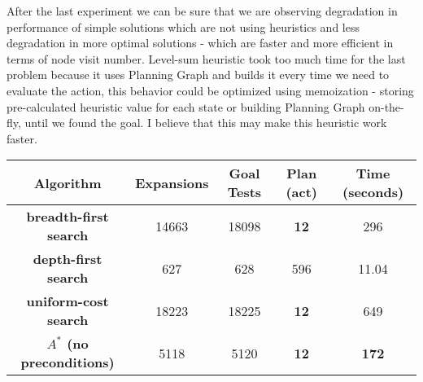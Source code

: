 \documentclass[11pt]{article}
\begin{document}
After the last experiment we can be sure that we are observing degradation in performance of simple solutions which are not using heuristics and less degradation in more optimal solutions - which are faster and more efficient in terms of node visit number. Level-sum heuristic took too much time for the last problem because it uses Planning Graph and builds it every time we need to evaluate the action, this behavior could be optimized using memoization - storing pre-calculated heuristic value for each state or building Planning Graph on-the-fly, until we found the goal. I believe that this may make this heuristic work faster.

\begin{center}
 \begin{tabular}{||c c c c c ||} 
 \hline
 Algorithm & Expansions & Goal Tests & Plan (act) & Time (seconds) \\ [0.5ex] 
 \hline\hline
 \textbf{breadth-first search} & 14663 & 18098  & \textbf{12} & 296 \\ 
 \hline
 \textbf{depth-first search} & 627 & 628 & 596 & 11.04 \\ 
 \hline
 \textbf{uniform-cost search} & 18223 & 18225 & \textbf{12} & 649 \\ 
 \hline
	\textbf{$A^{*}$ (no preconditions)} & 5118 & 5120 & \textbf{12} & \textbf{172}
	 \\ 
 \hline
\end{tabular}
\end{center}
\end{document}

